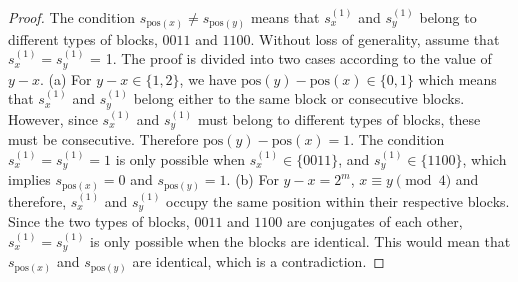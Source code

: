 \documentclass[11pt]{article}
\newtheorem{cor}{Corollary}
\def\mod{\!\pmod}
\begin{document}
\begin{proof}
The condition $s_{\text{pos}(x)}\neq s_{\text{pos}(y)}$ means that $s_x^{(1)}$ and $s_y^{(1)}$ belong to different types of blocks, $0011$ and $1100$. Without loss of generality, assume that $s_x^{(1)} = s_y^{(1)}$ = 1. The proof is divided into two cases according to the value of $y-x$. (a) For $y-x \in \{1,2 \}$, we have $\text{pos}(y)-\text{pos}(x)\in \{0, 1\}$ which means that $s_x^{(1)}$ and $s_y^{(1)}$ belong either to the same block or consecutive blocks. However, since $s_x^{(1)}$ and $s_y^{(1)}$ must belong to different types of blocks, these must be consecutive.
Therefore $\text{pos}(y)-\text{pos}(x)=1$. The condition $s_x^{(1)} = s_y^{(1)} = 1$ is only possible when 
$s_x^{(1)} \in \{0011\}$, and $s_y^{(1)} \in \{1100\}$, which implies $s_{\text{pos}(x)}=0$ and $s_{\text{pos}(y)}=1$. (b) For $y-x=2^m$, $x \equiv y \mod{4}$ and therefore, $s_x^{(1)}$ and $s_y^{(1)}$ occupy the same position within their respective blocks. Since the two types of blocks, $0011$ and $1100$ are conjugates of each other, $s^{(1)}_{x} = s^{(1)}_{y}$ is only possible when the blocks are identical. This would mean that $s_{\text{pos}(x)}$ and $s_{\text{pos}(y)}$ are identical, which is a contradiction.
\end{proof}

 

\end{document}
